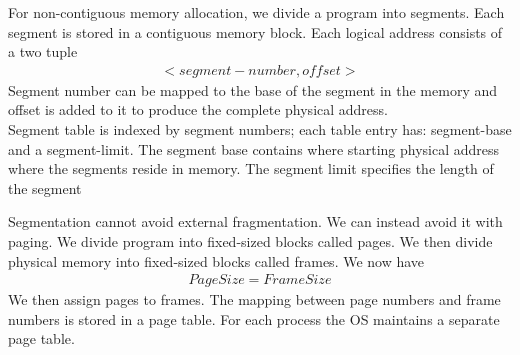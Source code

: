 \documentclass[a4paper]{article}
\theoremstyle{plain}
\theoremstyle{definition}
\newtheorem{defn}{Definition}[section]
\theoremstyle{remark}
\begin{document}
\begin{tcolorbox}[colback=black!3!white,colframe=black!60!white,title=\begin{defn}Segmentation \label{Segmentation}\end{defn}]
For non-contiguous memory allocation, we divide a program into segments. Each segment is stored in a contiguous memory block. Each logical address consists of a two tuple
\begin{align*}
	<segment-number,offset>
\end{align*}
Segment number can be mapped to the base of the segment in the memory and offset is added to it to produce the complete physical address. \\
Segment table is indexed by segment numbers; each table entry has: segment-base and a segment-limit. The segment base contains where starting physical address where the segments reside in memory. The segment limit specifies the length of the segment
\end{tcolorbox}
\begin{tcolorbox}[colback=black!3!white,colframe=black!60!white,title=\begin{defn}Paging \label{Paging}\end{defn}]
Segmentation cannot avoid external fragmentation. We can instead avoid it with paging. We divide program into fixed-sized blocks called pages. We then divide physical memory into fixed-sized blocks called frames. We now have
\begin{align*}
	PageSize = FrameSize
\end{align*}
We then assign pages to frames. The mapping between page numbers and frame numbers is stored in a page table. For each process the OS maintains a separate page table. 
\end{tcolorbox}
\end{document}
